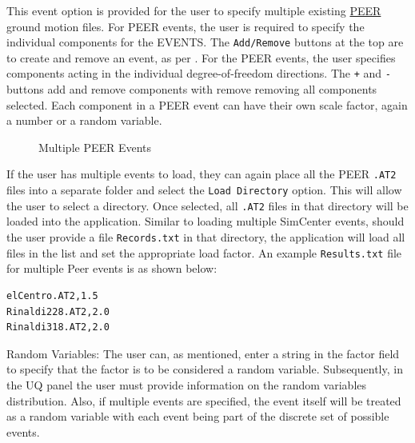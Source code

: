 This event option is provided for the user to specify multiple existing
\href{http://peer.berkeley.edu}{PEER} ground
motion files.  For PEER events, the user is required to specify the
individual components for the EVENTS.  The \texttt{Add/Remove} buttons
at the top are to create and remove an event, as
per . For the PEER events, the user
specifies components acting in the individual degree-of-freedom
directions.  The \texttt{+} and \texttt{-} buttons add and remove
components with remove removing all components selected. Each
component in a PEER event can have their own scale factor, again a
number or a random variable.

\begin{figure}[!htbp]
  \caption{Multiple PEER Events}
  \label{fig:figure6}
\end{figure}

If the user has multiple events to load, they can again place all the
PEER \texttt{.AT2} files into a separate folder and select
the \texttt{Load Directory} option. This will allow the user to select
a directory. Once selected, all \texttt{.AT2} files in that directory will be
loaded into the application. Similar to loading multiple SimCenter
events, should the user provide a file \texttt{Records.txt} in that
directory, the application will load all files in the list and set the
appropriate load factor. An example \texttt{Results.txt} file for multiple Peer
events is as shown below:

\begin{verbatim}
elCentro.AT2,1.5
Rinaldi228.AT2,2.0
Rinaldi318.AT2,2.0
\end{verbatim}

Random Variables: The user can, as mentioned, enter a string in the
factor field to specify that the factor is to be considered a random
variable. Subsequently, in the UQ panel the user must provide
information on the random variables distribution. Also, if multiple
events are specified, the event itself will be treated as a random
variable with each event being part of the discrete set of possible
events.
